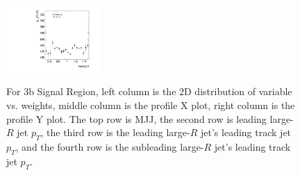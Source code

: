 \begin{figure}[htbp!]
\begin{center}
\includegraphics[width=0.32\textwidth,angle=-90]{figures/boosted/AppendixReweight/Weights/3Trk_Signal_sublHCand_trk0_Pt_weight_profy.pdf}\\
\caption{For 3b Signal Region, left column is the 2D distribution of variable vs. weights, middle column is the profile X plot, right column is the profile Y plot. The top row is MJJ, the second row is leading large-$R$ jet $p_{T}$, the third row is the leading large-$R$ jet's leading track jet $p_{T}$, and the fourth row is the subleading large-$R$ jet's leading track jet $p_{T}$.}
\label{fig:app-reweight-dist-3b-SR}
\end{center}
\end{figure}


